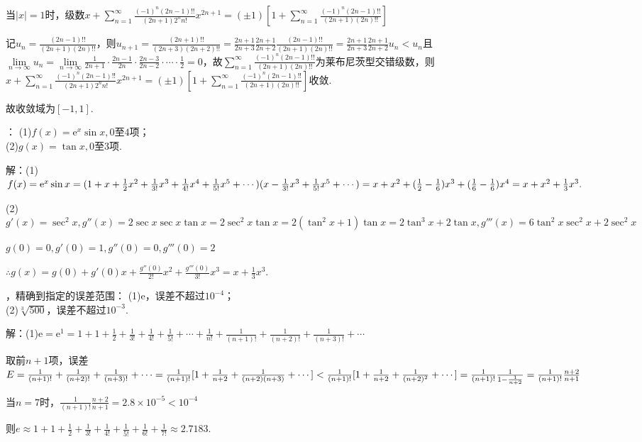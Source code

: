 \documentclass[12pt,UTF8]{ctexart}
\newcommand\Lim[0]{\lim\limits_{n\rightarrow\infty}}
\newcommand\Ser[1]{\sum_{n=#1}^\infty}
\begin{document}
\begin{enumerate}
当$|x|=1$时，级数$x+\Ser{1}\frac{(-1)^n(2n-1)!!}{(2n+1)2^nn!}x^{2n+1}=(\pm1)[1+\Ser{1}\frac{(-1)^n(2n-1)!!}{(2n+1)(2n)!!}]$

记$u_{n}=\frac{(2n-1)!!}{(2n+1)(2n)!!}$，则$u_{n+1}=\frac{(2n+1)!!}{(2n+3)(2n+2)!!}=\frac{2n+1}{2n+3}\frac{2n+1}{2n+2}\frac{(2n-1)!!}{(2n+1)(2n)!!}=\frac{2n+1}{2n+3}\frac{2n+1}{2n+2}u_{n}<u_n$且$\Lim u_n=\Lim\frac1{2n+1}\cdot\frac{2n-1}{2n}\cdot\frac{2n-3}{2n-2}\cdot\cdots\cdot\frac12=0$，故$\Ser{1}\frac{(-1)^n(2n-1)!!}{(2n+1)(2n)!!}$为莱布尼茨型交错级数，则$x+\Ser{1}\frac{(-1)^n(2n-1)!!}{(2n+1)2^nn!}x^{2n+1}=(\pm1)[1+\Ser{1}\frac{(-1)^n(2n-1)!!}{(2n+1)(2n)!!}]$收敛.

故收敛域为$[-1,1]$.

：
\newline
(1)$f(x)=\mathrm e^x\sin x,0$至$4$项；\\
(2)$g(x)=\tan x,0$至$3$项.

解：(1)$f(x)=\mathrm e^x\sin x=(1+x+\frac12x^2+\frac1{3!}x^3+\frac1{4!}x^4+\frac1{5!}x^5+\cdots)(x-\frac1{3!}x^3+\frac1{5!}x^5+\cdots)\\
=x+x^2+(\frac12-\frac16)x^3+(\frac16-\frac16)x^4=x+x^2+\frac13x^3.$

(2)$g'(x)=\sec^2x,g''(x)=2\sec x\sec x\tan x=2\sec^2x\tan x=2(\tan^2x+1)\tan x=2\tan^3x+2\tan x,g'''(x)=6\tan^2x\sec^2x+2\sec^2x$

$g(0)=0,g'(0)=1,g''(0)=0,g'''(0)=2$

$\therefore g(x)=g(0)+g'(0)x+\frac{g''(0)}{2!}x^2+\frac{g'''(0)}{3!}x^3=x+\frac13x^3$.

，精确到指定的误差范围：
\newline
(1)$\mathrm e$，误差不超过$10^{-4}$；\\
(2)$\sqrt[3]{500}$，误差不超过$10^{-3}$.

解：(1)$\mathrm e=\mathrm e^1=1+1+\frac12+\frac1{3!}+\frac1{4!}+\frac1{5!}+\cdots+\frac1{n!}+\frac1{(n+1)!}+\frac1{(n+2)!}+\frac1{(n+3)!}+\cdots$

取前$n+1$项，误差$E=\frac1{(n+1)!}+\frac1{(n+2)!}+\frac1{(n+3)!}+\cdots=\frac1{(n+1)!}[1+\frac1{n+2}+\frac1{(n+2)(n+3)}+\cdots]\\
<\frac1{(n+1)!}[1+\frac1{n+2}+\frac1{(n+2)^2}+\cdots]=\frac1{(n+1)!}\frac1{1-\frac1{n+2}}=\frac1{(n+1)!}\frac{n+2}{n+1}$

当$n=7$时，$\frac1{(n+1)!}\frac{n+2}{n+1}=2.8\times10^{-5}<10^{-4}$

则$e\approx1+1+\frac12+\frac1{3!}+\frac1{4!}+\frac1{5!}+\frac1{6!}+\frac1{7!}\approx2.7183$.


\end{enumerate}
\end{document}
